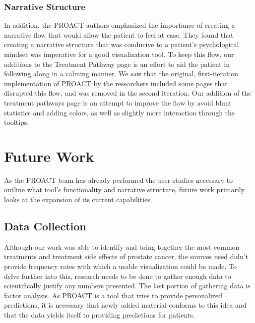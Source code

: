 \documentclass[journal]{vgtc}                %
\begin{document}
                \subsubsection{Narrative Structure}
                        In addition, the PROACT authors emphasized the importance of creating a narrative flow that would allow the patient to feel at ease.
                        They found that creating a narrative structure that was conducive to a patient's psychological mindset was imperative for a good visualization tool.
                        To keep this flow, our additions to the Treatment Pathway page is an effort to aid the patient in following along in a calming manner.
                        We saw that the original, first-iteration implementation of PROACT by the researchers included some pages that disrupted this flow, and was removed in the second iteration.
                        Our addition of the treatment pathways page is an attempt to improve the flow by avoid blunt statistics and adding colors, as well as slightly more interaction through the tooltips.



\section{Future Work}
        As the PROACT team has already performed the user studies necessary to outline what tool's functionality and narrative structure, future work primarily looks at the expansion of its current capabilities.

        \subsection{Data Collection}
                Although our work was able to identify and bring together the most common treatments and treatment side effects of prostate cancer, the sources used didn't provide frequency rates with which a usable visualization could be made.
                To delve further into this, research needs to be done to gather enough data to scientifically justify any numbers presented.
                The last portion of gathering data is factor analysis.
                As PROACT is a tool that tries to provide personalized predictions, it is necessary that newly added material conforms to this idea and that the data yields itself to providing predictions for patients.
\end{document}
